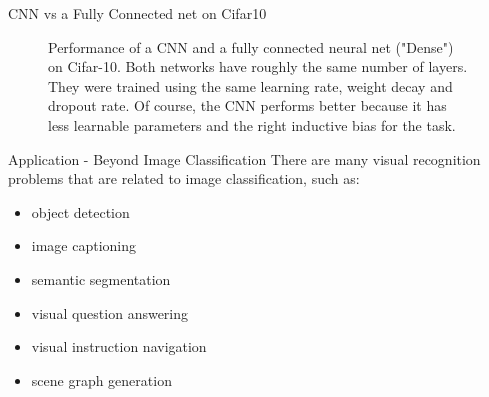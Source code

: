 \begin{frame} {CNN vs a Fully Connected net on Cifar10}
  \begin{figure}
        \centering
        \caption{Performance of a CNN and a fully connected neural net ("Dense") on Cifar-10. Both networks have roughly the same number of layers. They were trained using the same learning rate, weight decay and dropout rate. Of course, the CNN performs better because it has less learnable parameters and the right inductive bias for the task.}
    \end{figure} 
\end{frame}
\begin{vbframe}{Application - Beyond Image Classification}
There are many visual recognition problems that are related to image classification, such as:

\begin{itemize}
    \item object detection
    \item image captioning
    \item semantic segmentation
    \item visual question answering
    \item visual instruction navigation
    \item scene graph generation
\end{itemize}
\end{vbframe}


